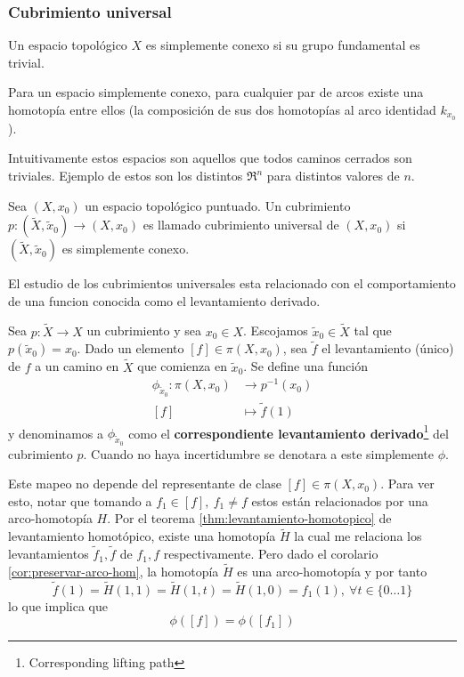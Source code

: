 \subsubsection{Cubrimiento universal}
\begin{definicion}
  Un espacio topológico \(X\) es simplemente conexo si su grupo
  fundamental es trivial.
\end{definicion}
\begin{acotacion}
  Para un espacio simplemente conexo, para cualquier par de arcos
  existe una homotopía entre ellos (la composición de sus dos homotopías
  al arco identidad \(k_{x_0}\)).
\end{acotacion}
Intuitivamente estos espacios son aquellos que todos caminos cerrados
son triviales. Ejemplo de estos son los distintos \(\Re^n\) para
distintos valores de \(n\).
\begin{definicion}
  Sea \(\left( X, x_0 \right)\) un espacio topológico puntuado. Un
  cubrimiento \(p : \left( \tilde X , \tilde x _0 \right) \to \left( X ,
    x _0 \right)\) es llamado cubrimiento universal de \( \left(
    X , x _0 \right)\) si \(\left( \tilde X , \tilde x _0
  \right)\) es simplemente conexo.
\end{definicion}
El estudio de los cubrimientos universales esta relacionado con el
comportamiento de una funcion conocida como el levantamiento derivado.
\begin{definicion} \label{def:levantamiento-derivado}
  Sea \(p : \tilde X \to X\) un cubrimiento y sea \(x_0 \in X\).
  Escojamos \(\tilde x _0 \in \tilde X\) tal que \(p(\tilde x _0) =
  x_0\). Dado un elemento \([f] \in \pi (X, x_0)\), sea \(\tilde f\) el
  levantamiento (único) de \(f\) a un camino en \(\tilde X\) que
  comienza en \(\tilde x _0\). Se define una función
  \begin{align*}
    \phi_{\tilde x_0} : \pi (X, x_0) &\longrightarrow p^{-1} (x_0) \\
    [f] &\longmapsto \tilde f (1)
  \end{align*}
  y denominamos a \(\phi_{\tilde x_0}\) como el \textbf{correspondiente
  levantamiento derivado}\footnote{Corresponding lifting path} del
  cubrimiento \(p\). Cuando no haya incertidumbre se denotara a este
  simplemente \(\phi\).
\end{definicion}
\begin{acotacion} \label{aco:indep-phi}
  Este mapeo no depende del representante de clase \([f] \in \pi \left(
    X, x_0 \right)\). Para ver esto, notar que tomando a \(f_1 \in [f]
  ,\ f_1 \neq f\) estos están relacionados por una arco-homotopía
  \(H\). Por el teorema \ref{thm:levantamiento-homotopico} de
  levantamiento homotópico, existe una homotopía \(\tilde H\) la cual me
  relaciona los levantamientos \(\tilde f_1 , \tilde f\) de \(f_1 , f\)
  respectivamente. Pero dado el corolario \ref{cor:preservar-arco-hom},
  la homotopía \(\tilde H\) es una arco-homotopía y por tanto
  \[ \tilde f (1) = \tilde H (1, 1) = \tilde H (1, t) = \tilde H (1, 0)
    = f_1 (1) ,\ \forall t \in \{0 \dotsc 1\} \]
  lo que implica que
  \[ \phi ([f]) = \phi ([f_1])\]
\end{acotacion}

